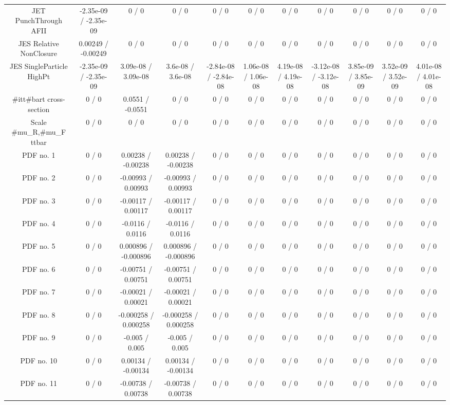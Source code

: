 \begin{table}[htbp]
\begin{center}
\begin{tabular}{|c|c|c|c|c|c|c|c|c|c|c|}
  JET PunchThrough AFII & -2.35e-09 / -2.35e-09 & 0 / 0 & 0 / 0 & 0 / 0 & 0 / 0 & 0 / 0 & 0 / 0 & 0 / 0 & 0 / 0 & 0 / 0 \\ 
  JES Relative NonClosure & 0.00249 / -0.00249 & 0 / 0 & 0 / 0 & 0 / 0 & 0 / 0 & 0 / 0 & 0 / 0 & 0 / 0 & 0 / 0 & 0 / 0 \\ 
  JES SingleParticle HighPt & -2.35e-09 / -2.35e-09 & 3.09e-08 / 3.09e-08 & 3.6e-08 / 3.6e-08 & -2.84e-08 / -2.84e-08 & 1.06e-08 / 1.06e-08 & 4.19e-08 / 4.19e-08 & -3.12e-08 / -3.12e-08 & 3.85e-09 / 3.85e-09 & 3.52e-09 / 3.52e-09 & 4.01e-08 / 4.01e-08 \\ 
  #it{t#bar{t}} cross-section & 0 / 0 & 0.0551 / -0.0551 & 0 / 0 & 0 / 0 & 0 / 0 & 0 / 0 & 0 / 0 & 0 / 0 & 0 / 0 & 0 / 0 \\ 
  Scale #mu_{R},#mu_{F} ttbar & 0 / 0 & 0 / 0 & 0 / 0 & 0 / 0 & 0 / 0 & 0 / 0 & 0 / 0 & 0 / 0 & 0 / 0 & 0 / 0 \\ 
  PDF no. 1 & 0 / 0 & 0.00238 / -0.00238 & 0.00238 / -0.00238 & 0 / 0 & 0 / 0 & 0 / 0 & 0 / 0 & 0 / 0 & 0 / 0 & 0 / 0 \\ 
  PDF no. 2 & 0 / 0 & -0.00993 / 0.00993 & -0.00993 / 0.00993 & 0 / 0 & 0 / 0 & 0 / 0 & 0 / 0 & 0 / 0 & 0 / 0 & 0 / 0 \\ 
  PDF no. 3 & 0 / 0 & -0.00117 / 0.00117 & -0.00117 / 0.00117 & 0 / 0 & 0 / 0 & 0 / 0 & 0 / 0 & 0 / 0 & 0 / 0 & 0 / 0 \\ 
  PDF no. 4 & 0 / 0 & -0.0116 / 0.0116 & -0.0116 / 0.0116 & 0 / 0 & 0 / 0 & 0 / 0 & 0 / 0 & 0 / 0 & 0 / 0 & 0 / 0 \\ 
  PDF no. 5 & 0 / 0 & 0.000896 / -0.000896 & 0.000896 / -0.000896 & 0 / 0 & 0 / 0 & 0 / 0 & 0 / 0 & 0 / 0 & 0 / 0 & 0 / 0 \\ 
  PDF no. 6 & 0 / 0 & -0.00751 / 0.00751 & -0.00751 / 0.00751 & 0 / 0 & 0 / 0 & 0 / 0 & 0 / 0 & 0 / 0 & 0 / 0 & 0 / 0 \\ 
  PDF no. 7 & 0 / 0 & -0.00021 / 0.00021 & -0.00021 / 0.00021 & 0 / 0 & 0 / 0 & 0 / 0 & 0 / 0 & 0 / 0 & 0 / 0 & 0 / 0 \\ 
  PDF no. 8 & 0 / 0 & -0.000258 / 0.000258 & -0.000258 / 0.000258 & 0 / 0 & 0 / 0 & 0 / 0 & 0 / 0 & 0 / 0 & 0 / 0 & 0 / 0 \\ 
  PDF no. 9 & 0 / 0 & -0.005 / 0.005 & -0.005 / 0.005 & 0 / 0 & 0 / 0 & 0 / 0 & 0 / 0 & 0 / 0 & 0 / 0 & 0 / 0 \\ 
  PDF no. 10 & 0 / 0 & 0.00134 / -0.00134 & 0.00134 / -0.00134 & 0 / 0 & 0 / 0 & 0 / 0 & 0 / 0 & 0 / 0 & 0 / 0 & 0 / 0 \\ 
  PDF no. 11 & 0 / 0 & -0.00738 / 0.00738 & -0.00738 / 0.00738 & 0 / 0 & 0 / 0 & 0 / 0 & 0 / 0 & 0 / 0 & 0 / 0 & 0 / 0 \\ 

\end{tabular}
\end{center}
\end{table}
